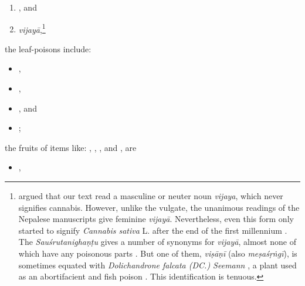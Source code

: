 \begin{translation}
\begin{itemize}
\begin{enumerate}
\item
{}, and 

\item
\emph{vijayā},\footnote{\citet[61, n.\,3]{meul-sear} argued that our text read a
masculine or neuter noun \emph{vijaya}, which never signifies cannabis.  
However,
unlike the vulgate, the unanimous readings of the Nepalese manuscripts give
feminine \emph{vijayā}.  Nevertheless, even this form only started to signify
\emph{Cannabis sativa} L. after the end of the first millennium
\citep{meul-sear,wuja-cann,mchu-2021a}. The \emph{Sauśrutanighaṇṭu} 
gives a number of synonyms for \emph{vijayā}, almost none 
of
which have any poisonous parts \citep[5.77,
10.143]{suve-2000}.  But one of them, \emph{viṣāṇī} (also
\emph{meṣaśṛṅgī}), is sometimes equated with \emph{Dolichandrone falcata 
(DC.)
Seemann} \citep[518]{adps}, a plant used as an abortifacient and fish poison
\citep[\#862]{nadk-1982}.  This identification is tenuous.}
%
%        
        \end{enumerate}
        \end{itemize}
    
        \item
        the leaf-poisons include:
             \begin{itemize}            
        \item {},
        \item {},
        \item {},
        and
        \item {};
            \end{itemize}

        \item
        the fruits of items like:
        ,
        ,
        , and
        ,
        are
                    \begin{itemize}
         \item {},
         

\end{itemize}
\end{translation}
